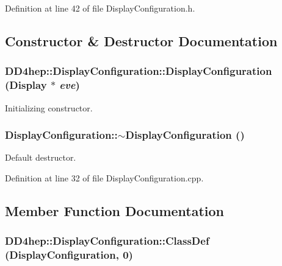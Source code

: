 Definition at line 42 of file DisplayConfiguration.h.

\subsection{Constructor \& Destructor Documentation}
\hypertarget{class_d_d4hep_1_1_display_configuration_aa27fd31b55d167964c8d5e6d66c8a597}{
\subsubsection[{DisplayConfiguration}]{\setlength{\rightskip}{0pt plus 5cm}DD4hep::DisplayConfiguration::DisplayConfiguration ({\bf Display} $\ast$ {\em eve})}}
\label{class_d_d4hep_1_1_display_configuration_aa27fd31b55d167964c8d5e6d66c8a597}


Initializing constructor. \hypertarget{class_d_d4hep_1_1_display_configuration_a2271117a8a383c48f4f90728974e2b6d}{
\subsubsection[{$\sim$DisplayConfiguration}]{\setlength{\rightskip}{0pt plus 5cm}DisplayConfiguration::$\sim$DisplayConfiguration ()}}
\label{class_d_d4hep_1_1_display_configuration_a2271117a8a383c48f4f90728974e2b6d}


Default destructor. 

Definition at line 32 of file DisplayConfiguration.cpp.

\subsection{Member Function Documentation}
\hypertarget{class_d_d4hep_1_1_display_configuration_a93b904a9305d5666bef3094fb5db6551}{
\subsubsection[{ClassDef}]{\setlength{\rightskip}{0pt plus 5cm}DD4hep::DisplayConfiguration::ClassDef ({\bf DisplayConfiguration}, \/  0)}}
\label{class_d_d4hep_1_1_display_configuration_a93b904a9305d5666bef3094fb5db6551}


